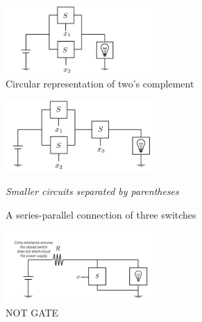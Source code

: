\documentclass[12pt,openany]{book}
\begin{document}
			      	
			      	 
			      	
			      	\begin{figure}[htp] %
			      		\centering
			      		\includegraphics[width=0.5\textwidth]{circuits/6.1.3_2.png} %
			      		\caption*{Circular representation of two's complement}
			      	\end{figure}
			      	
			      	
			      	\begin{figure}[htp] %
			      		\centering
			      		\includegraphics[width=0.5\textwidth]{circuits/6.1.3_3.png} %
			      		\caption*{A series-parallel connection of three switches}
			      		 \newline
			      		\textit{Smaller circuits separated by parentheses}
			      	\end{figure}
			      	
			      	
			      	\begin{figure}[htp]
			      		\centering
			      		\includegraphics[width=0.5\textwidth]{circuits/6.1.3_4.png} %
			      		\caption*{NOT GATE} %
			      		\label{fig:notgate} %
			      		\medskip %
			      	\end{figure}
			      	\newpage
\end{document}
